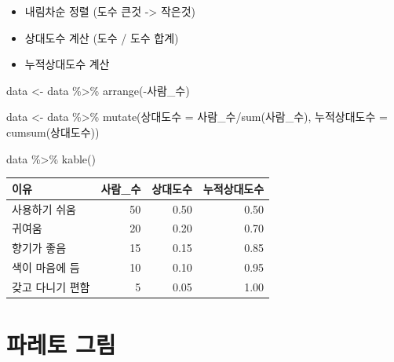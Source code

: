 \documentclass[
  letterpaper,
  DIV=11,
  numbers=noendperiod]{scrreprt}
\newenvironment{Shaded}{\begin{snugshade}}{\end{snugshade}}
\newcommand{\FunctionTok}[1]{\textcolor[rgb]{0.28,0.35,0.67}{#1}}
\newcommand{\NormalTok}[1]{\textcolor[rgb]{0.00,0.23,0.31}{#1}}
\newcommand{\OtherTok}[1]{\textcolor[rgb]{0.00,0.23,0.31}{#1}}
\newcommand{\SpecialCharTok}[1]{\textcolor[rgb]{0.37,0.37,0.37}{#1}}
\begin{document}
\begin{itemize}
\item
  내림차순 정렬 (도수 큰것 -\textgreater{} 작은것)
\item
  상대도수 계산 (도수 / 도수 합계)
\item
  누적상대도수 계산
\end{itemize}

\begin{Shaded}
\begin{Highlighting}[]
\NormalTok{data }\OtherTok{\textless{}{-}}\NormalTok{ data }\SpecialCharTok{\%\textgreater{}\%} \FunctionTok{arrange}\NormalTok{(}\SpecialCharTok{{-}}\NormalTok{사람\_수)}

\NormalTok{data }\OtherTok{\textless{}{-}}\NormalTok{ data }\SpecialCharTok{\%\textgreater{}\%} \FunctionTok{mutate}\NormalTok{(상대도수 }\OtherTok{=}\NormalTok{ 사람\_수}\SpecialCharTok{/}\FunctionTok{sum}\NormalTok{(사람\_수),}
\NormalTok{                누적상대도수 }\OtherTok{=} \FunctionTok{cumsum}\NormalTok{(상대도수))}

\NormalTok{data }\SpecialCharTok{\%\textgreater{}\%} \FunctionTok{kable}\NormalTok{()}
\end{Highlighting}
\end{Shaded}

\begin{longtable}[]{@{}lrrr@{}}
\toprule\noalign{}
이유 & 사람\_수 & 상대도수 & 누적상대도수 \\
\midrule\noalign{}
\endhead
\bottomrule\noalign{}
\endlastfoot
사용하기 쉬움 & 50 & 0.50 & 0.50 \\
귀여움 & 20 & 0.20 & 0.70 \\
향기가 좋음 & 15 & 0.15 & 0.85 \\
색이 마음에 듬 & 10 & 0.10 & 0.95 \\
갖고 다니기 편함 & 5 & 0.05 & 1.00 \\
\end{longtable}

\hypertarget{uxd30cuxb808uxd1a0-uxadf8uxb9bc-1}{%
\section{파레토 그림}\label{uxd30cuxb808uxd1a0-uxadf8uxb9bc-1}}
\end{document}
